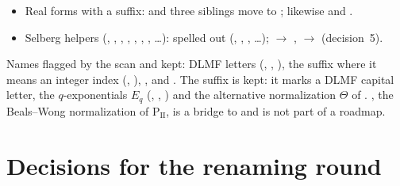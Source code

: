 \documentclass[11pt,a4paper]{article}
\begin{document}
\begin{itemize}
     $\to$ ;  $\to$
    ;  $\to$ 
    and the other  names; ,  $\to$
    , .
  \item Real forms with a  suffix:  and three siblings move
    to ; likewise  and
    .
  \item Selberg helpers (, , , , ,
    , , \ldots): spelled out (,
    , , \ldots);  $\to$
    ,  $\to$  (decision~5).
\end{itemize}

Names flagged by the scan and kept: DLMF letters (, ,
), the suffix  where it means an integer index
(, ), , 
and . The suffix  is kept: it marks a DLMF capital letter,
the $q$-exponentials $E_q$ (, , ) and the
alternative normalization $\Theta$ of . , the
Beals--Wong normalization of $\mathrm{P_{II}}$, is a bridge to  and is not
part of a roadmap.

\section{Decisions for the renaming round}
\end{document}
